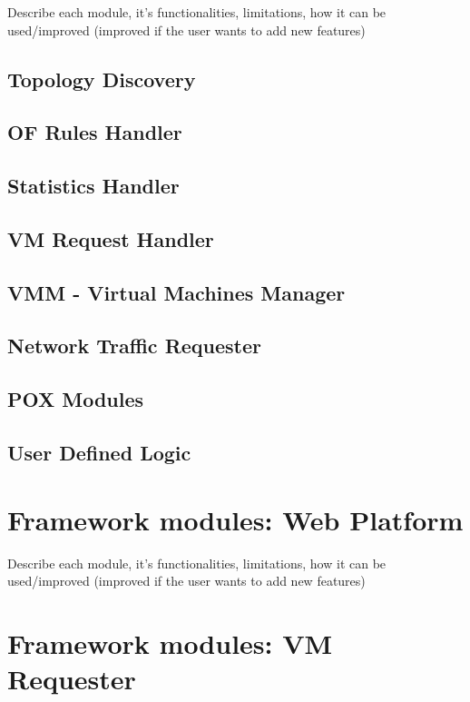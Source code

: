 \documentclass[12pt,english]{book}
\begin{document}
Describe each module, it's functionalities, limitations, how it can be used/improved (improved if the user wants to add new features)

\subsection{Topology Discovery}

\subsection{OF Rules Handler}

\subsection{Statistics Handler}

\subsection{VM Request Handler}

\subsection{VMM - Virtual Machines Manager}

\subsection{Network Traffic Requester}

\subsection{POX Modules}

\subsection{User Defined Logic}

\section{Framework modules: Web Platform}

Describe each module, it's functionalities, limitations, how it can be used/improved (improved if the user wants to add new features)

\section{Framework modules: VM Requester}
\end{document}
